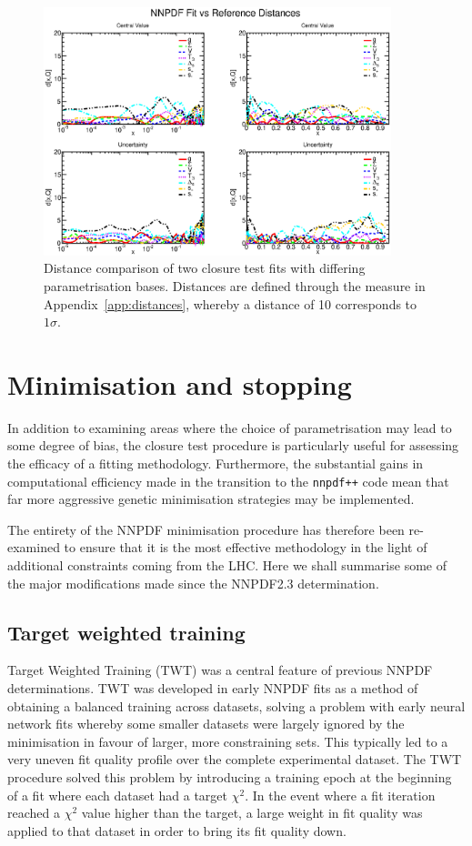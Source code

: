 \begin{figure}[!]
\centering
\includegraphics[width=0.9\textwidth]{7-PostLHC/figs/EVOLvs23BASIS/distances_evol.eps}
\caption[Distance comparison of two closure test fits with differing parametrisation bases]{Distance comparison of two closure test fits with differing parametrisation bases. Distances are defined through the measure in Appendix~\ref{app:distances}, whereby a distance of 10 corresponds to $1\sigma$.}
\label{fig:EVOLvs23BASIS}
\end{figure}
  
\section{Minimisation and stopping}
In addition to examining areas where the choice of parametrisation may lead to some degree of bias, the closure test procedure is particularly useful for assessing the efficacy of a fitting methodology. Furthermore, the substantial gains in computational efficiency made in the transition to the {\tt nnpdf++} code mean that far more aggressive genetic minimisation strategies may be implemented.

The entirety of the NNPDF minimisation procedure has therefore been re-examined to ensure that it is the most effective methodology in the light of additional constraints coming from the LHC. Here we shall summarise some of the major modifications made since the NNPDF2.3 determination.

\subsection{Target weighted training}
Target Weighted Training (TWT) was a central feature of previous NNPDF determinations. TWT was developed in early NNPDF fits as a method of obtaining a balanced training across datasets, solving a problem with early neural network fits whereby some smaller datasets
were largely ignored by the minimisation in favour of larger, more constraining sets. This typically led to a very uneven fit quality profile over the complete experimental dataset. The TWT procedure solved this problem by introducing a training epoch at the beginning of a fit where each dataset had a target $\chi^2$. In the event where a fit iteration reached a $\chi^2$ value higher than the target, a large weight in fit quality was applied to that dataset in order to bring its fit quality down. 

